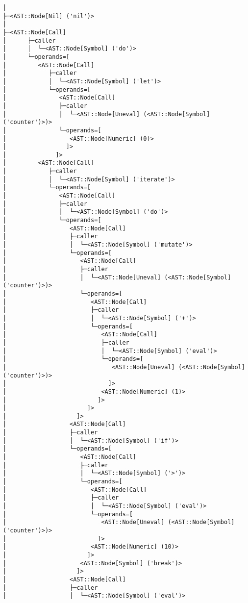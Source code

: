 \documentclass{article}
\begin{document}
      \begin{Verbatim}[baselinestretch=0.75]
│
├─<AST::Node[Nil] ('nil')>
│
├─<AST::Node[Call]
│      ├─caller
│      │  └─<AST::Node[Symbol] ('do')>
│      └─operands=[
│         <AST::Node[Call]
│            ├─caller
│            │  └─<AST::Node[Symbol] ('let')>
│            └─operands=[
│               <AST::Node[Call]
│               ├─caller
│               │  └─<AST::Node[Uneval] (<AST::Node[Symbol] ('counter')>)>
│               └─operands=[
│                  <AST::Node[Numeric] (0)>
│                 ]>
│              ]>
│         <AST::Node[Call]
│            ├─caller
│            │  └─<AST::Node[Symbol] ('iterate')>
│            └─operands=[
│               <AST::Node[Call]
│               ├─caller
│               │  └─<AST::Node[Symbol] ('do')>
│               └─operands=[
│                  <AST::Node[Call]
│                  ├─caller
│                  │  └─<AST::Node[Symbol] ('mutate')>
│                  └─operands=[
│                     <AST::Node[Call]
│                     ├─caller
│                     │  └─<AST::Node[Uneval] (<AST::Node[Symbol] ('counter')>)>
│                     └─operands=[
│                        <AST::Node[Call]
│                        ├─caller
│                        │  └─<AST::Node[Symbol] ('+')>
│                        └─operands=[
│                           <AST::Node[Call]
│                           ├─caller
│                           │  └─<AST::Node[Symbol] ('eval')>
│                           └─operands=[
│                              <AST::Node[Uneval] (<AST::Node[Symbol] ('counter')>)>
│                             ]>
│                           <AST::Node[Numeric] (1)>
│                          ]>
│                       ]>
│                    ]>
│                  <AST::Node[Call]
│                  ├─caller
│                  │  └─<AST::Node[Symbol] ('if')>
│                  └─operands=[
│                     <AST::Node[Call]
│                     ├─caller
│                     │  └─<AST::Node[Symbol] ('>')>
│                     └─operands=[
│                        <AST::Node[Call]
│                        ├─caller
│                        │  └─<AST::Node[Symbol] ('eval')>
│                        └─operands=[
│                           <AST::Node[Uneval] (<AST::Node[Symbol] ('counter')>)>
│                          ]>
│                        <AST::Node[Numeric] (10)>
│                       ]>
│                     <AST::Node[Symbol] ('break')>
│                    ]>
│                  <AST::Node[Call]
│                  ├─caller
│                  │  └─<AST::Node[Symbol] ('eval')>

\end{Verbatim}
\end{document}
